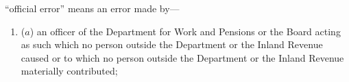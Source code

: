 \documentclass[12pt,a4paper]{article}
\begin{document}
\begin{enumerate}
%


%
%

    “official error” means an error made by—
\begin{enumerate}\item[]
    ($a$) 
    an officer of the Department for Work and Pensions
 or the Board acting as such which no person outside the Department
 or the Inland Revenue caused or to which no person outside the Department
 or the Inland Revenue materially contributed;
 

\end{enumerate}
\end{enumerate}
\end{document}
